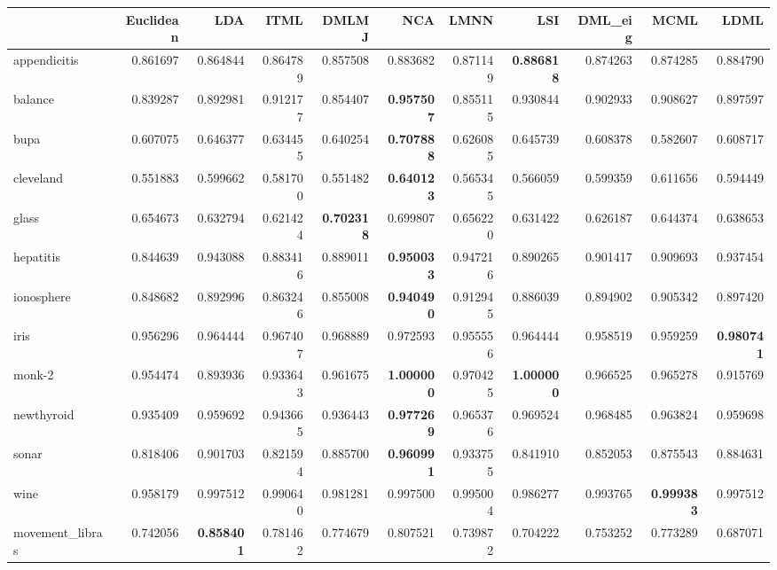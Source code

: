 \begin{tabular}{lrrrrrrrrrr}
\toprule
{} &  Euclidean &       LDA &      ITML &     DMLMJ &       NCA &      LMNN &       LSI &   DML\_eig &      MCML &      LDML \\
\midrule
appendicitis    &   0.861697 &  0.864844 &  0.864789 &  0.857508 &  0.883682 &  0.871149 &  \textbf{0.886818} &  0.874263 &  0.874285 &  0.884790 \\
balance         &   0.839287 &  0.892981 &  0.912177 &  0.854407 &  \textbf{0.957507} &  0.855115 &  0.930844 &  0.902933 &  0.908627 &  0.897597 \\
bupa            &   0.607075 &  0.646377 &  0.634455 &  0.640254 &  \textbf{0.707888} &  0.626085 &  0.645739 &  0.608378 &  0.582607 &  0.608717 \\
cleveland       &   0.551883 &  0.599662 &  0.581700 &  0.551482 &  \textbf{0.640123} &  0.565345 &  0.566059 &  0.599359 &  0.611656 &  0.594449 \\
glass           &   0.654673 &  0.632794 &  0.621424 &  \textbf{0.702318} &  0.699807 &  0.656220 &  0.631422 &  0.626187 &  0.644374 &  0.638653 \\
hepatitis       &   0.844639 &  0.943088 &  0.883416 &  0.889011 &  \textbf{0.950033} &  0.947216 &  0.890265 &  0.901417 &  0.909693 &  0.937454 \\
ionosphere      &   0.848682 &  0.892996 &  0.863246 &  0.855008 &  \textbf{0.940490} &  0.912945 &  0.886039 &  0.894902 &  0.905342 &  0.897420 \\
iris            &   0.956296 &  0.964444 &  0.967407 &  0.968889 &  0.972593 &  0.955556 &  0.964444 &  0.958519 &  0.959259 &  \textbf{0.980741} \\
monk-2          &   0.954474 &  0.893936 &  0.933643 &  0.961675 &  \textbf{1.000000} &  0.970425 &  \textbf{1.000000} &  0.966525 &  0.965278 &  0.915769 \\
newthyroid      &   0.935409 &  0.959692 &  0.943665 &  0.936443 &  \textbf{0.977269} &  0.965376 &  0.969524 &  0.968485 &  0.963824 &  0.959698 \\
sonar           &   0.818406 &  0.901703 &  0.821594 &  0.885700 &  \textbf{0.960991} &  0.933755 &  0.841910 &  0.852053 &  0.875543 &  0.884631 \\
wine            &   0.958179 &  0.997512 &  0.990640 &  0.981281 &  0.997500 &  0.995004 &  0.986277 &  0.993765 &  \textbf{0.999383} &  0.997512 \\
movement\_libras &   0.742056 &  \textbf{0.858401} &  0.781462 &  0.774679 &  0.807521 &  0.739872 &  0.704222 &  0.753252 &  0.773289 &  0.687071 \\

\end{tabular}
